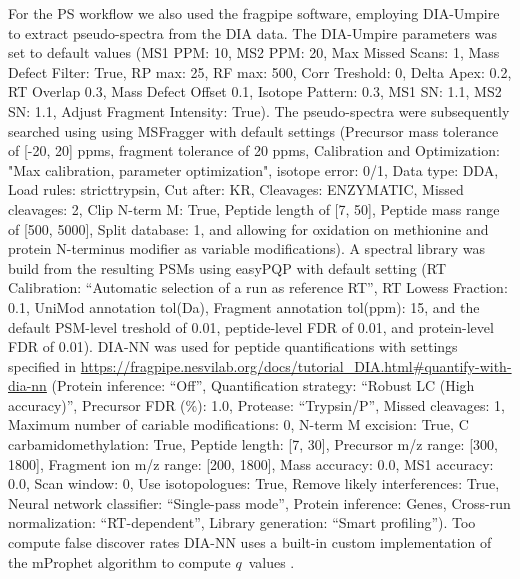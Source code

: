 \documentclass[10pt,letterpaper]{article}
\begin{document}
For the PS workflow we also used the fragpipe software, employing DIA-Umpire to extract pseudo-spectra from the DIA data. The DIA-Umpire parameters was set to default values (MS1 PPM: 10, MS2 PPM: 20, Max Missed Scans: 1, Mass Defect Filter: True, RP max: 25, RF max: 500, Corr Treshold: 0, Delta Apex: 0.2, RT Overlap 0.3, Mass Defect Offset 0.1, Isotope Pattern: 0.3, MS1 SN: 1.1, MS2 SN: 1.1, Adjust Fragment Intensity: True). The pseudo-spectra were subsequently searched using using MSFragger with default settings (Precursor mass tolerance of [-20, 20] ppms, fragment tolerance of 20 ppms, Calibration and Optimization: "Max calibration, parameter optimization", isotope error: 0/1, Data type: DDA, Load rules: stricttrypsin, Cut after: KR, Cleavages: ENZYMATIC, Missed cleavages: 2, Clip N-term M: True, Peptide length of [7, 50], Peptide mass range of [500, 5000], Split database: 1, and allowing for oxidation on methionine and protein N-terminus modifier as variable modifications). A spectral library was build from the resulting PSMs using easyPQP with default setting (RT Calibration: ``Automatic selection of a run as reference RT'', RT Lowess Fraction: 0.1, UniMod annotation tol(Da), Fragment annotation tol(ppm): 15, and the default PSM-level treshold of 0.01, peptide-level FDR of 0.01, and protein-level FDR of 0.01). DIA-NN was used for peptide quantifications with settings specified in \url{https://fragpipe.nesvilab.org/docs/tutorial_DIA.html#quantify-with-dia-nn} (Protein inference: ``Off'', Quantification strategy: ``Robust LC (High accuracy)'', Precursor FDR (\%): 1.0, Protease: ``Trypsin/P'', Missed cleavages: 1, Maximum number of cariable modifications: 0, N-term M excision: True, C carbamidomethylation: True, Peptide length: [7, 30], Precursor m/z range: [300, 1800], Fragment ion m/z range: [200, 1800], Mass accuracy: 0.0, MS1 accuracy: 0.0, Scan window: 0, Use isotopologues: True, Remove likely interferences: True, Neural network classifier: ``Single-pass mode'', Protein inference: Genes, Cross-run normalization: ``RT-dependent'', Library generation: ``Smart profiling''). Too compute false discover rates DIA-NN uses a built-in custom implementation of the mProphet algorithm to compute $q$~values \cite{reiter2011mprophet, demichev2020dia}.
 
 
\end{document}
